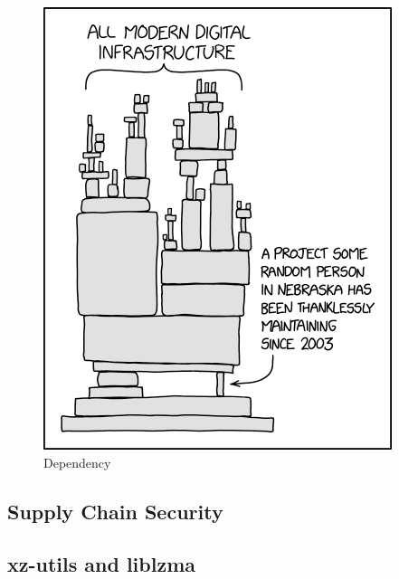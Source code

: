 \begin{figure}[H]
    \includegraphics[scale=0.5]{assets/dependency.png}
    \caption{Dependency \cite{xkcdUnknownDependency}}
    \label{img:dependency}
\end{figure}

\subsection{Supply Chain Security}

\cite{ccc2024supplychainsec}

\subsection{xz-utils and liblzma}

\cite{ccc2024backdoor}
